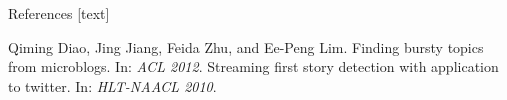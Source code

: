 \documentclass{beamer}
\begin{document}
\begin{frame}
\begin{columns}[T]
\begin{column}{.46\textwidth}
{\begin{block}{References}
[text]
\begin{thebibliography}{9}
\footnotesize{Qiming Diao, Jing Jiang, Feida Zhu, and Ee-Peng Lim. Finding bursty topics from microblogs. In: \emph{ACL 2012}.}
\footnotesize{Streaming first story detection with application to twitter. In: \emph{HLT-NAACL 2010}.}
\end{thebibliography}
\vspace*{-1.25ex}
\end{block}
}
\end{column}

\end{columns}
\end{frame}
\end{document}
